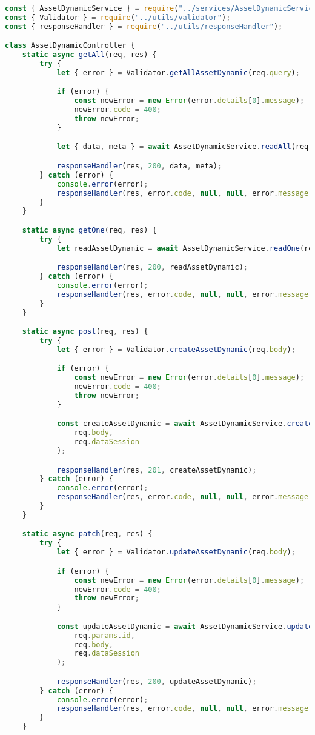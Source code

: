 \begin{lstlisting}[language=Javascript,caption={Asset Dynamic Controller}]
const { AssetDynamicService } = require("../services/AssetDynamicService");
const { Validator } = require("../utils/validator");
const { responseHandler } = require("../utils/responseHandler");

class AssetDynamicController {
	static async getAll(req, res) {
		try {
			let { error } = Validator.getAllAssetDynamic(req.query);

			if (error) {
				const newError = new Error(error.details[0].message);
				newError.code = 400;
				throw newError;
			}

			let { data, meta } = await AssetDynamicService.readAll(req.query);

			responseHandler(res, 200, data, meta);
		} catch (error) {
			console.error(error);
			responseHandler(res, error.code, null, null, error.message);
		}
	}

	static async getOne(req, res) {
		try {
			let readAssetDynamic = await AssetDynamicService.readOne(req.params.id);

			responseHandler(res, 200, readAssetDynamic);
		} catch (error) {
			console.error(error);
			responseHandler(res, error.code, null, null, error.message);
		}
	}

	static async post(req, res) {
		try {
			let { error } = Validator.createAssetDynamic(req.body);

			if (error) {
				const newError = new Error(error.details[0].message);
				newError.code = 400;
				throw newError;
			}

			const createAssetDynamic = await AssetDynamicService.create(
				req.body,
				req.dataSession
			);

			responseHandler(res, 201, createAssetDynamic);
		} catch (error) {
			console.error(error);
			responseHandler(res, error.code, null, null, error.message);
		}
	}

	static async patch(req, res) {
		try {
			let { error } = Validator.updateAssetDynamic(req.body);

			if (error) {
				const newError = new Error(error.details[0].message);
				newError.code = 400;
				throw newError;
			}

			const updateAssetDynamic = await AssetDynamicService.update(
				req.params.id,
				req.body,
				req.dataSession
			);

			responseHandler(res, 200, updateAssetDynamic);
		} catch (error) {
			console.error(error);
			responseHandler(res, error.code, null, null, error.message);
		}
	}


\end{lstlisting}
